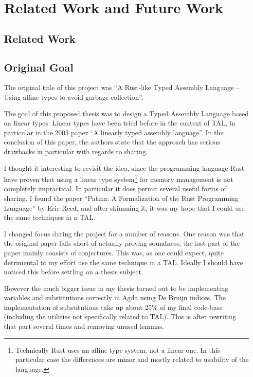 \chapter{Related Work and Future Work}
\label{chap:future}
\section{Related Work}

\section{Original Goal}

The original title of this project was ``A Rust-like Typed Assembly Language --
Using affine types to avoid garbage collection''.

The goal of this proposed thesis was to design a Typed Assembly Language based
on linear types. Linear types have been tried before in the context of TAL, in
particular in the 2003 paper ``A linearly typed assembly
language''\cite{ltal}. In the conclusion of this paper, the authors state that the approach
has serious drawbacks in particular with regards to sharing.

I thought it interesting to revisit the idea, since the programming language
Rust\cite{rust} have proven that using a linear type system\footnote{Technically
  Rust uses an affine type system, not a linear one. In this particular case the
  differences are minor and mostly related to usability of the language.} for
memory management is not completely impractical. In particular it does permit
several useful forms of sharing. I found the paper ``Patina: A Formalization of
the Rust Programming Language''\cite{patina} by Eric Reed, and after skimming
it, it was my hope that I could use the same techniques in a TAL.

I changed focus during the project for a number of reasons. One reason was that
the original paper falls short of actually proving soundness; the last part of
the paper mainly consists of conjectures. This was, as one could expect, quite
detrimental to my effort use the same technique in a TAL. Ideally I should have
noticed this before settling on a thesis subject.

However the much bigger issue in my thesis turned out to be implementing
variables and substitutions correctly in Agda using De Bruijn indices. The
implementation of substitutions take up about 25\% of my final code-base
(including the utilities not specifically related to TAL). This is after
rewriting that part several times and removing unused lemmas.


